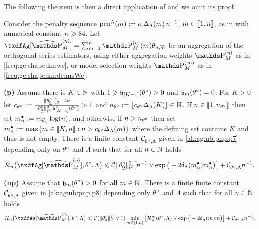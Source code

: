 The following theorem is then a direct application of  and we omit its proof.

\begin{thm}
Consider the penalty sequence $\penSv:=\penD$, $\Di\in\nset{1,n}$, as in  with numerical constant $\cpen \geq 84$.
Let $\txdfAg[{\erWe[]}]=\sum_{\Di=1}^{\ssY}\We\txdfPr$ be an aggregation of the orthogonal series estimators, using either aggregation weights $\rWe[]$ as in \eqref{freq:ge:shape:kn:we}, or model selection weights $\msWe[]$ as in \eqref{freq:ge:shape:kn:de:msWe}.
\begin{Liste}[]
\item[{\dgrau\bfseries{(p)}}]Assume there is $K\in\Nz$
  with   $1\geq \bias[{[K-1] }](\xdf)>0$ and $\bias[\Di](\xdf)=0$. For
  $K>0$ let
  $ c_{\xdf}:=\tfrac{\Vnormlp{\xdf_{\underline{0}}}^2+4\cpen}{\Vnormlp{\xdf_{\underline{0}}}^2\bias[{[K-1]}]^2(\xdf)}>1$ and
  $\ssY_{\xdf}:=\gauss{c_{\xdf}\DipenSv[K]}\in\Nz$. If
  $\ssY\in\nset{1,\ssY_{\xdf}}$ then set $\sDi{\ssY}:=\Di_{\cst{3}}\log(\ssY)$, and otherwise if
  $\ssY>\ssY_{\xdf}$ then set
  $\sDi{\ssY}:=\max\{\Di\in\nset{K,\ssY}:\ssY>c_{\xdf}\DipenSv\}$
  where the defining set contains $K$ and thus is not empty.
There is a finite constant $\cst{\xdf,\Lambda}$
given in \eqref{ak:ag:ub:pnp:p7} depending only on $\xdf$ and $\Lambda$ such that for all $n\in\Nz$ holds
\begin{equation}
  \nRi{\txdfAg[{\erWe[]}]}{\xdf,\Lambda}
  \leq
  \cst{}\Vnormlp{\xdf_{\underline{0}}}^2\big[
  \ssY^{-1}\vee\exp\big(-2\cmiSv[\sDi{\ssY}]\sDi{\ssY}\big)\big]
  + \cst{\xdf,\Lambda}\ssY^{-1}.
\end{equation}
\item[{\dgrau\bfseries{(np)}}] Assume that
  $\bias(\xdf)>0$ for all  $\Di\in\Nz$.
There is a finite finite constant $\cst{\xdf,\Lambda}$ given in
\eqref{ak:ag:ub:pnp:p8} depending only $\xdf$ and $\Lambda$ such that for all
$\ssY\in\Nz$  holds 
 \begin{equation}
   \nRi{\txdfAg[{\erWe[]}]}{\xdf,\Lambda}
    \leq 
   \cst{}(\Vnormlp{\xdf_{\underline{0}}}^2\vee1)\min_{\Di\in\nset{1,\ssY}}\big[\dRa{\Di}{\xdf,\Lambda}\vee\exp\big(-2\cmiSv\Di\big)\big]\\
   +\cst{\xdf,\Lambda}\ssY^{-1}.
\end{equation}
\end{Liste} 
\reEnd 
\end{thm}

